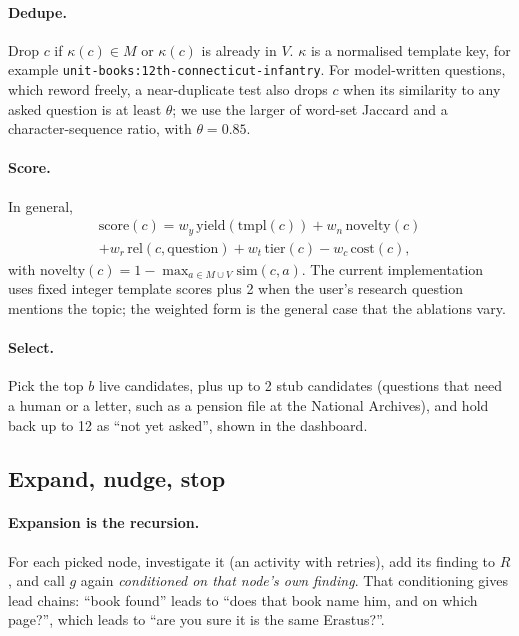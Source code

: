 \paragraph{Dedupe.} Drop $c$ if $\kappa(c)\in M$ or $\kappa(c)$ is already in $V$. $\kappa$ is a normalised template key, for example \texttt{unit-books:12th-connecticut-infantry}. For model-written questions, which reword freely, a near-duplicate test also drops $c$ when its similarity to any asked question is at least $\theta$; we use the larger of word-set Jaccard and a character-sequence ratio, with $\theta=0.85$.

\paragraph{Score.} In general,
\begin{multline}
\mathrm{score}(c)=w_y\,\mathrm{yield}(\mathrm{tmpl}(c))+w_n\,\mathrm{novelty}(c)\\
+w_r\,\mathrm{rel}(c,\text{question})+w_t\,\mathrm{tier}(c)-w_c\,\mathrm{cost}(c),
\end{multline}
with $\mathrm{novelty}(c)=1-\max_{a\in M\cup V}\mathrm{sim}(c,a)$. The current implementation uses fixed integer template scores plus 2 when the user's research question mentions the topic; the weighted form is the general case that the ablations vary.

\paragraph{Select.} Pick the top $b$ live candidates, plus up to 2 stub candidates (questions that need a human or a letter, such as a pension file at the National Archives), and hold back up to 12 as ``not yet asked'', shown in the dashboard.

\subsection{Expand, nudge, stop}
\paragraph{Expansion is the recursion.} For each picked node, investigate it (an activity with retries), add its finding to $R$, and call $g$ again \emph{conditioned on that node's own finding}. That conditioning gives lead chains: ``book found'' leads to ``does that book name him, and on which page?'', which leads to ``are you sure it is the same Erastus?''.


